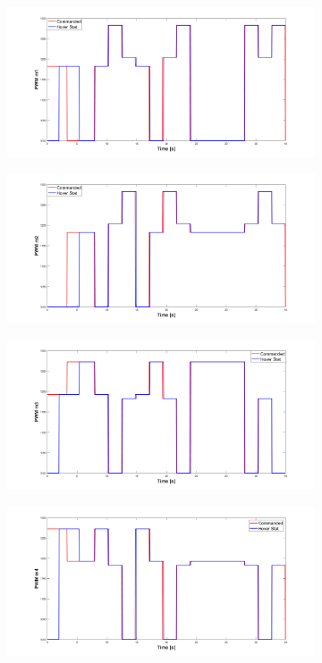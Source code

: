 \documentclass[12pt,titlepage]{article}
\begin{document}
\begin{figure}[H]
	\begin{subfigure}{0.49\textwidth}
	\centering
	\includegraphics[width = \textwidth]{Images/lag_data_2_spec_2_m1.png}
	\end{subfigure}
	\begin{subfigure}{0.49\textwidth}
	\includegraphics[width = \textwidth]{Images/lag_data_2_spec_2_m2.png}
	\end{subfigure}
    \begin{subfigure}{0.49\textwidth}
	\includegraphics[width = \textwidth]{Images/lag_data_2_spec_2_m3.png}
	\end{subfigure}
	\begin{subfigure}{0.49\textwidth}
	\includegraphics[width = \textwidth]{Images/lag_data_2_spec_2_m4.png}

\end{subfigure}
\end{figure}
\end{document}
